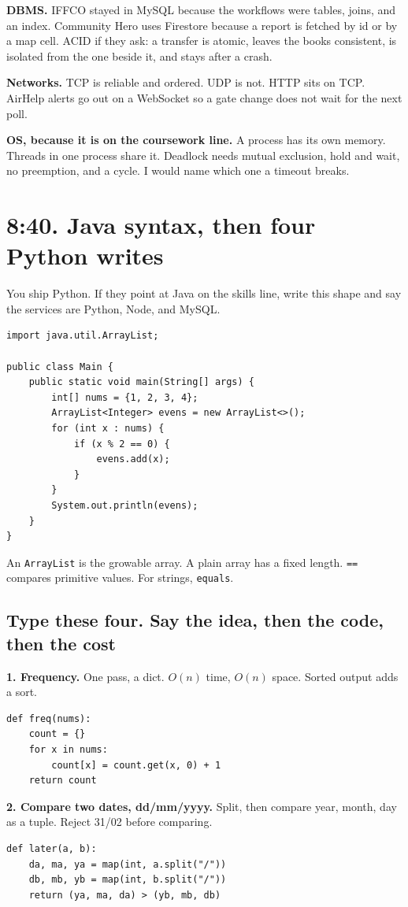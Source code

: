 \documentclass[a4paper,9.5pt]{extarticle}
\begin{document}
\textbf{DBMS.} IFFCO stayed in MySQL because the workflows were tables, joins, and an index. Community Hero uses Firestore because a report is fetched by id or by a map cell. ACID if they ask: a transfer is atomic, leaves the books consistent, is isolated from the one beside it, and stays after a crash.

\textbf{Networks.} TCP is reliable and ordered. UDP is not. HTTP sits on TCP. AirHelp alerts go out on a WebSocket so a gate change does not wait for the next poll.

\textbf{OS, because it is on the coursework line.} A process has its own memory. Threads in one process share it. Deadlock needs mutual exclusion, hold and wait, no preemption, and a cycle. I would name which one a timeout breaks.

\section{8:40. Java syntax, then four Python writes}
You ship Python. If they point at Java on the skills line, write this shape and say the services are Python, Node, and MySQL.
\begin{verbatim}
import java.util.ArrayList;

public class Main {
    public static void main(String[] args) {
        int[] nums = {1, 2, 3, 4};
        ArrayList<Integer> evens = new ArrayList<>();
        for (int x : nums) {
            if (x % 2 == 0) {
                evens.add(x);
            }
        }
        System.out.println(evens);
    }
}
\end{verbatim}
\noindent An \texttt{ArrayList} is the growable array. A plain array has a fixed length. \texttt{==} compares primitive values. For strings, \texttt{equals}.

\subsection{Type these four. Say the idea, then the code, then the cost}
\textbf{1. Frequency.} One pass, a dict. $O(n)$ time, $O(n)$ space. Sorted output adds a sort.
\begin{verbatim}
def freq(nums):
    count = {}
    for x in nums:
        count[x] = count.get(x, 0) + 1
    return count
\end{verbatim}

\textbf{2. Compare two dates, dd/mm/yyyy.} Split, then compare year, month, day as a tuple. Reject 31/02 before comparing.
\begin{verbatim}
def later(a, b):
    da, ma, ya = map(int, a.split("/"))
    db, mb, yb = map(int, b.split("/"))
    return (ya, ma, da) > (yb, mb, db)
\end{verbatim}
\end{document}
